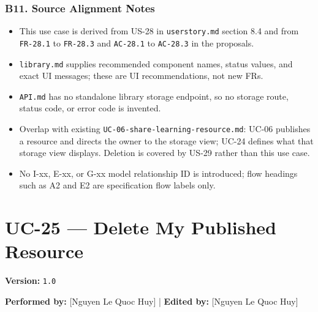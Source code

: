 \documentclass[12pt]{article}
\begin{document}
\hypertarget{sec:b11-source-alignment-notes}{}
\subsubsection*{B11. Source Alignment Notes}
\par\medskip

\begin{itemize}
\item This use case is derived from US-28 in \texttt{userstory.md} section 8.4 and from \texttt{FR-28.1} to \texttt{FR-28.3} and \texttt{AC-28.1} to \texttt{AC-28.3} in the proposals.
\item \texttt{library.md} supplies recommended component names, status values, and exact UI messages; these are UI recommendations, not new FRs.
\item \texttt{API.md} has no standalone library storage endpoint, so no storage route, status code, or error code is invented.
\item Overlap with existing \texttt{UC-06-share-learning-resource.md}: UC-06 publishes a resource and directs the owner to the storage view; UC-24 defines what that storage view displays. Deletion is covered by US-29 rather than this use case.
\item No I-xx, E-xx, or G-xx model relationship ID is introduced; flow headings such as A2 and E2 are specification flow labels only.
\end{itemize}
\par\medskip

\pagebreak
\hypertarget{sec:uc-25-delete-my-published-resource}{}
\section*{UC-25 --- Delete My Published Resource}
\par\medskip

\textbf{Version:} \texttt{1.0}
\par\medskip

\textbf{Performed by:} [Nguyen Le Quoc Huy] | \textbf{Edited by:} [Nguyen Le Quoc Huy]
\par\medskip
\end{document}
